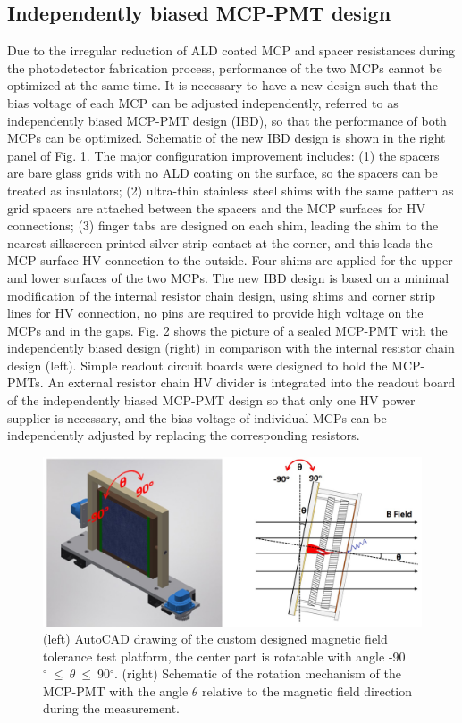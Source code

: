 \documentclass[preprint,5p]{elsarticle}
\begin{document}
\subsection{Independently biased MCP-PMT design} \label{sec_design}
Due to the irregular reduction of ALD coated MCP and spacer resistances during 
the photodetector fabrication process, performance of the two MCPs cannot be 
optimized at the same time. It is necessary to have a new design such that the bias 
voltage of each MCP can be adjusted independently, referred to as independently 
biased MCP-PMT design (IBD), so that the performance of both MCPs can be optimized.  
Schematic of the new IBD design is shown in the right panel of Fig. 1. The 
major configuration improvement includes: (1) the spacers are bare glass grids with
no ALD coating on the surface, so the spacers can be treated as 
insulators; (2) ultra-thin stainless steel shims with the same pattern as grid 
spacers are attached between the spacers and the MCP surfaces for HV 
connections; (3) finger tabs are designed on each shim, leading the shim to the 
nearest silkscreen printed silver strip contact at the corner, and this leads the MCP 
surface HV connection to the outside. Four shims are applied for the upper and 
lower surfaces of the two MCPs. The new IBD design is based on a minimal 
modification of the internal resistor chain design, using shims and corner 
strip lines for HV connection, no pins are required to provide high voltage on 
the MCPs and in the gaps. Fig. 2 shows the picture of a sealed MCP-PMT with the 
independently biased design (right) in comparison with the internal resistor 
chain design (left). Simple readout circuit boards were designed to hold the 
MCP-PMTs. An external resistor chain HV divider is integrated into the readout 
board of the independently biased MCP-PMT design so that only one HV power 
supplier is necessary, and the bias voltage of individual MCPs can be 
independently adjusted by replacing the corresponding resistors. 

\begin{figure}[tbp]
\centering \includegraphics[scale=0.6]{fig/Figure3.jpg}
\caption{(left) AutoCAD drawing of the custom designed magnetic field tolerance 
   test platform, the center part is rotatable with angle 
   -90$^{\circ}~\leq~\theta~\leq~$90$^{\circ}$.  (right) Schematic of the 
   rotation mechanism of the MCP-PMT with the angle $\theta$ relative to the 
   magnetic field direction during the measurement. } \label{fig:design}
\end{figure}
\end{document}
